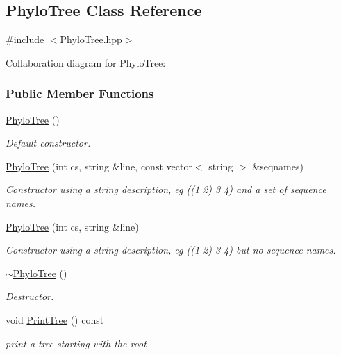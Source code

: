 \hypertarget{classPhyloTree}{\subsection{\-Phylo\-Tree \-Class \-Reference}
\label{classPhyloTree}
}


{\ttfamily \#include $<$\-Phylo\-Tree.\-hpp$>$}



\-Collaboration diagram for \-Phylo\-Tree\-:
\subsubsection*{\-Public \-Member \-Functions}
\begin{DoxyCompactItemize}
\item 
\hyperlink{classPhyloTree_ab6e00efe0c10f4a93d34e7d027489ac6}{\-Phylo\-Tree} ()
\begin{DoxyCompactList}\small\item\em \-Default constructor. \end{DoxyCompactList}\item 
\hyperlink{classPhyloTree_a0b54fc5ece14eeec6f28945306d070fd}{\-Phylo\-Tree} (int cs, string \&line, const vector$<$ string $>$ \&seqnames)
\begin{DoxyCompactList}\small\item\em \-Constructor using a string description, eg ((1 2) 3 4) and a set of sequence names. \end{DoxyCompactList}\item 
\hyperlink{classPhyloTree_a70200f6baa49702caa47c79d59d92a39}{\-Phylo\-Tree} (int cs, string \&line)
\begin{DoxyCompactList}\small\item\em \-Constructor using a string description, eg ((1 2) 3 4) but no sequence names. \end{DoxyCompactList}\item 
\hyperlink{classPhyloTree_a4a4c3d1b60f3bba1fe813a0ada4de498}{$\sim$\-Phylo\-Tree} ()
\begin{DoxyCompactList}\small\item\em \-Destructor. \end{DoxyCompactList}\item 
void \hyperlink{classPhyloTree_ac593ca7be08c1b02b1b9e4d5229363bd}{\-Print\-Tree} () const 
\begin{DoxyCompactList}\small\item\em print a tree starting with the root \end{DoxyCompactList}\item 

\end{DoxyCompactItemize}
